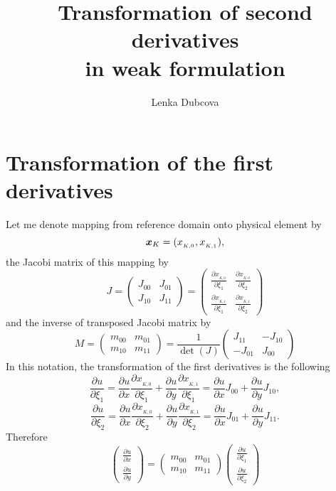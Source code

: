 \documentclass[a4paper,12pt]{article}
\title{Transformation of second derivatives\\[2mm] in weak formulation}
\author{Lenka Dubcova}
\newcommand{\bfx}{\mbox{\boldmath $x$}}
\begin{document}
\maketitle

\section{Transformation of the first derivatives}
Let me denote mapping from reference domain onto physical element by $$\bfx_K = (x_{_{K, 0}}, x_{_{K, 1}}),$$ the Jacobi matrix of this mapping by
$$J =
\left(\begin{array}{cc}
J_{00} & J_{01} \\[3mm]
J_{10} & J_{11}
\end{array}\right) = 
\left(\begin{array}{cc}
\frac{\partial x_{_{K,0}}}{\partial \xi_1} & \frac{\partial x_{_{K,0}}}{\partial \xi_2} \\[3mm]
\frac{\partial x_{_{K,1}}}{\partial \xi_1} & \frac{\partial x_{_{K,1}}}{\partial \xi_2} \end{array}\right)
$$
and the inverse of transposed Jacobi matrix by
$$M = 
\left(\begin{array}{cc}
m_{00} & m_{01} \\
m_{10} & m_{11}
\end{array}\right) = \frac{1}{\det(J)}
\left(\begin{array}{cc}
J_{11} & -J_{10} \\
-J_{01} & J_{00}
\end{array}\right)
$$
In this notation, the transformation of the first derivatives is the following
$$\frac{\partial u}{\partial \xi_1} = \frac{\partial u}{\partial x} \frac{\partial x_{_{K,0}}}{\partial \xi_1} + \frac{\partial u}{\partial y} \frac{\partial x_{_{K,1}}}{\partial \xi_1} = \frac{\partial u}{\partial x} J_{00} + \frac{\partial u}{\partial y} J_{10},$$
$$\frac{\partial u}{\partial \xi_2} = \frac{\partial u}{\partial x} \frac{\partial x_{_{K,0}}}{\partial \xi_2} + \frac{\partial u}{\partial y} \frac{\partial x_{_{K,1}}}{\partial \xi_2} = \frac{\partial u}{\partial x} J_{01} + \frac{\partial u}{\partial y} J_{11}.$$
Therefore
$$
\left(\begin{array}{c}
\frac{\partial u}{\partial x} \\[3mm]
\frac{\partial u}{\partial y} 
\end{array}\right) = 
\left(\begin{array}{cc}
m_{00} & m_{01} \\[3mm]
m_{10} & m_{11}
\end{array}\right) \left(\begin{array}{c}
\frac{\partial u}{\partial \xi_1} \\[3mm]
\frac{\partial u}{\partial \xi_2} 
\end{array}\right)
$$
\end{document}
